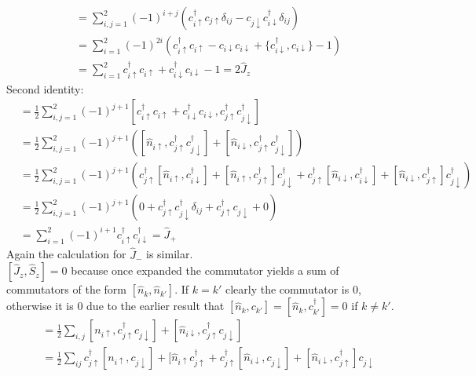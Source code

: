 \documentclass{article}
\begin{document}
\begin{enumerate}[a)]
\begin{align*}
&= \sum_{i,j=1}^2 (-1)^{i+j} (c_{i\uparrow}^\dagger c_{j\uparrow} \delta_{ij} - c_{j\downarrow} c_{i\downarrow}^\dagger \delta_{ij}) \\ 
&= \sum_{i=1}^2 (-1)^{2i}(c_{i\uparrow}^\dagger c_{i\uparrow} - c_{i\downarrow}c_{i\downarrow} + \{c_{i\downarrow}^\dagger, c_{i\downarrow}\} - 1) \\
&= \sum_{i=1}^2 c_{i\uparrow}^\dagger c_{i\uparrow} + c_{i\downarrow}^\dagger c_{i\downarrow} - 1 = 2\hat{J}_z
\end{align*}
Second identity:
\begin{align*}
[\hat{J}_z, \hat{J}_+] &= \frac{1}{2} \sum_{i,j=1}^2 (-1)^{j+1} [c_{i\uparrow}^\dagger c_{i\uparrow} + c_{i\downarrow}^\dagger c_{i\downarrow}, c_{j\uparrow}^\dagger c_{j \downarrow}^\dagger] \\
&= \frac{1}{2}\sum_{i,j=1}^2 (-1)^{j+1} ([\hat{n}_{i\uparrow}, c_{j\uparrow}^\dagger c_{j\downarrow}^\dagger] + [\hat{n}_{i\downarrow}, c_{j\uparrow}^\dagger c_{j\downarrow}^\dagger]) \\
&= \frac{1}{2} \sum_{i,j=1}^2 (-1)^{j+1} (c_{j\uparrow}^\dagger [\hat{n}_{i\uparrow}, c_{i\downarrow}^\dagger] + [\hat{n}_{i\uparrow}, c_{j\uparrow}^\dagger] c_{j\downarrow}^\dagger  + c_{j\uparrow}^\dagger [\hat{n}_{i\downarrow}, c_{i\downarrow}^\dagger] + [\hat{n}_{i\downarrow}, c_{j\uparrow}^\dagger]c_{j\downarrow}^\dagger) \\
&= \frac{1}{2} \sum_{i,j=1}^2 (-1)^{j+1} (0 + c_{j\uparrow}^\dagger c_{j\downarrow}^\dagger \delta_{ij} + c_{j\uparrow}^\dagger c_{j\downarrow} + 0) \\
&= \sum_{i=1}^2 (-1)^{i+1} c_{i\uparrow}^\dagger c_{i\downarrow}^\dagger = \hat{J}_+
\end{align*}
Again the calculation for $\hat{J}_- $ is similar. \\
$[\hat{J}_z, \hat{S}_z] = 0$ because once expanded the commutator yields a sum of commutators of the form $[\hat{n}_k, \hat{n}_{k'}]$. If $k=k'$ clearly the commutator is 0, otherwise it is 0 due to the earlier result that $[\hat{n}_k, c_{k'}] = [\hat{n}_k, c_{k'}^\dagger] = 0$ if $k \neq k'$. \\
\begin{align*}
[\hat{J}_z, \hat{S}_+] &= \frac{1}{2} \sum_{i,j} [n_{i\uparrow}, c_{j\uparrow}^\dagger c_{j\downarrow}] + [\hat{n}_{i\downarrow}, c_{j\uparrow}^\dagger c_{j\downarrow} ] \\
&= \frac{1}{2} \sum_{ij} c_{j\uparrow}^\dagger [n_{i\uparrow}, c_{j\downarrow}] + [\hat{n}_{i\uparrow} c_{j\uparrow}^\dagger + c_{j\uparrow}^\dagger [\hat{n}_{i\downarrow}, c_{j\downarrow}] + [\hat{n}_{i \downarrow}, c_{j\uparrow}^\dagger] c_{j\downarrow} \\

\end{align*}
\end{enumerate}
\end{document}
